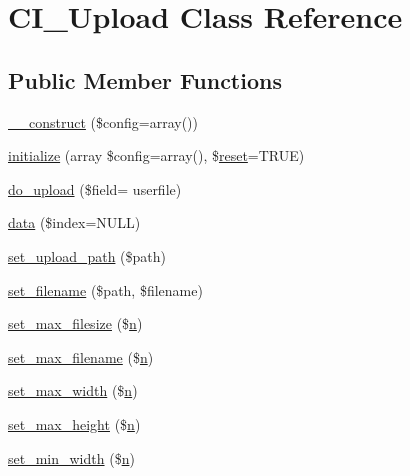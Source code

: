 \hypertarget{class_c_i___upload}{}\section{C\+I\+\_\+\+Upload Class Reference}
\label{class_c_i___upload}
\subsection*{Public Member Functions}
\begin{DoxyCompactItemize}
\item 
\hyperlink{class_c_i___upload_af7f9493844d2d66e924e3c1df51ce616}{\+\_\+\+\_\+construct} (\$config=array())
\item 
\hyperlink{class_c_i___upload_a58cef448bae0c178f3f675700b7e4413}{initialize} (array \$config=array(), \$\hyperlink{canvasjs_8js_a4603440e8345caceeed0d4f0bab77b2f}{reset}=T\+R\+U\+E)
\item 
\hyperlink{class_c_i___upload_ad4cb1d2aafb3690018dfdeb09010a48c}{do\+\_\+upload} (\$field= \textquotesingle{}userfile\textquotesingle{})
\item 
\hyperlink{class_c_i___upload_afe56c7645362202d2f1c7b8f7da67f39}{data} (\$index=N\+U\+L\+L)
\item 
\hyperlink{class_c_i___upload_ab2407f3a942d9b203f54e21194cf040d}{set\+\_\+upload\+\_\+path} (\$path)
\item 
\hyperlink{class_c_i___upload_a4b09b3f2b57a8bafcac1700f43d12c36}{set\+\_\+filename} (\$path, \$filename)
\item 
\hyperlink{class_c_i___upload_a1f78c3a54f32d313294b27cde4eafaf4}{set\+\_\+max\+\_\+filesize} (\$\hyperlink{cli_2error__general_8php_ace0fd03cd383f20ce6ea63247a207294}{n})
\item 
\hyperlink{class_c_i___upload_aa288c7337b534788b32d66b23e25548e}{set\+\_\+max\+\_\+filename} (\$\hyperlink{cli_2error__general_8php_ace0fd03cd383f20ce6ea63247a207294}{n})
\item 
\hyperlink{class_c_i___upload_a4028f187a825a666976cc3fe47cd44a8}{set\+\_\+max\+\_\+width} (\$\hyperlink{cli_2error__general_8php_ace0fd03cd383f20ce6ea63247a207294}{n})
\item 
\hyperlink{class_c_i___upload_aaed82d431f5aeee6a0af294bc604a51e}{set\+\_\+max\+\_\+height} (\$\hyperlink{cli_2error__general_8php_ace0fd03cd383f20ce6ea63247a207294}{n})
\item 
\hyperlink{class_c_i___upload_afe47751e024dc9bf07333060628e0fb4}{set\+\_\+min\+\_\+width} (\$\hyperlink{cli_2error__general_8php_ace0fd03cd383f20ce6ea63247a207294}{n})

\end{DoxyCompactItemize}
